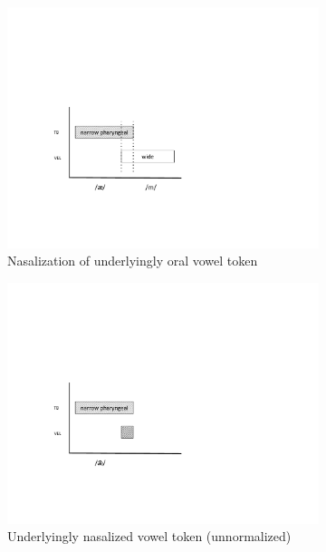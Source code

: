 \begin{figure}[H]
\begin{subfigure}[t]{.3\textwidth}
        \includegraphics[width=\linewidth]{figures/nasalization1.pdf}
        \caption{\label{fig:Normal nasalization}Nasalization of underlyingly oral vowel token}
    \end{subfigure}\hfill
    \begin{subfigure}[t]{.3\textwidth}
        \includegraphics[width=\linewidth]{figures/nasalization2.pdf}
        \caption{\label{fig:nasalized vowel}Underlyingly nasalized vowel token (unnormalized)}
    \end{subfigure}\hfill
    \begin{subfigure}[t]{.3\textwidth}

\end{subfigure}
\end{figure}
